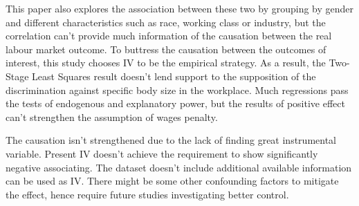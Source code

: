 \documentclass{article}
\begin{document}
\par
\setlength{\parindent}{2em}
This paper also explores the association between these two by grouping by gender and different characteristics such as race, working class or industry, but the correlation can't provide much information of the causation between the real labour market outcome. To buttress the causation between the outcomes of interest, this study chooses IV to be the empirical strategy. As a result, the Two-Stage Least Squares result doesn't lend support to the supposition of the discrimination against specific body size in the workplace. Much regressions pass the tests of endogenous and explanatory power, but the results of positive effect can't strengthen the assumption of wages penalty. 
\par
\setlength{\parindent}{2em}
The causation isn't strengthened due to the lack of finding great instrumental variable. Present IV doesn't achieve the requirement to show significantly negative associating. The dataset doesn't include additional available information can be used as IV. There might be some other confounding factors to mitigate the effect, hence require future studies investigating better control. 
\end{document}
